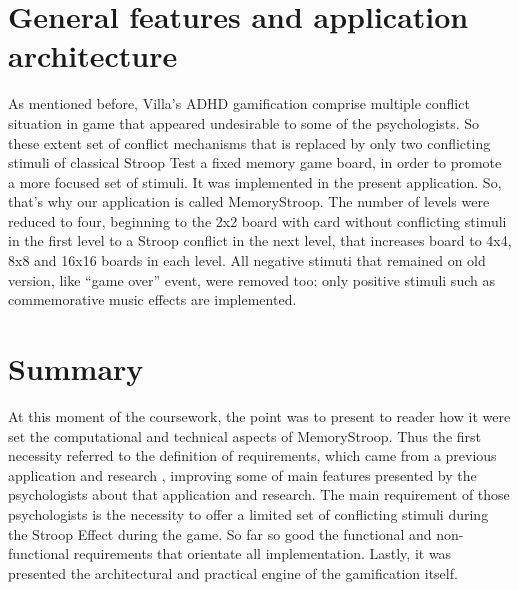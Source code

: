 \section{General features and application architecture}

As mentioned before, Villa's ADHD gamification comprise multiple conflict situation in game that appeared undesirable to some of the psychologists. So these extent set of conflict mechanisms that is replaced by only two conflicting stimuli of classical Stroop Test a fixed memory game board, in order to promote a more focused set of stimuli. It was implemented in the present application. So, that's why our application is called MemoryStroop. The number of levels were reduced to four, beginning to the 2x2 board with card without conflicting stimuli in the first level to a Stroop conflict in the next level, that increases board to 4x4, 8x8 and 16x16 boards in each level. All negative stimuti that remained on old version, like ``game over'' event, were removed too: only positive stimuli such as commemorative music effects are implemented. 
		
		
\section{Summary}
		
At this moment of the coursework, the point was to present to reader how it were set the computational and technical aspects of MemoryStroop. Thus the first necessity referred to the definition of requirements, which came from a previous application and research \citep{Villa}, improving some of main features presented by the psychologists about that application and research. The main requirement of those psychologists is the necessity to offer a limited set of conflicting stimuli during the Stroop Effect during the game. So far so good the functional and non-functional  requirements that orientate all implementation. Lastly, it was presented the architectural and practical engine of the gamification itself.